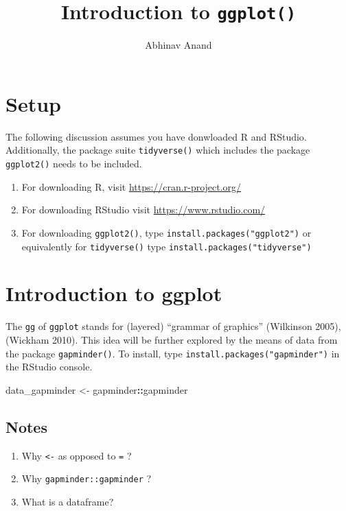 \documentclass[]{article}
\title{Introduction to \texttt{ggplot()}}
\author{Abhinav Anand}
\date{}
\newenvironment{Shaded}{\begin{snugshade}}{\end{snugshade}}
\newcommand{\StringTok}[1]{\textcolor[rgb]{0.31,0.60,0.02}{#1}}
\newcommand{\OperatorTok}[1]{\textcolor[rgb]{0.81,0.36,0.00}{\textbf{#1}}}
\newcommand{\NormalTok}[1]{#1}
\providecommand{\tightlist}{%
  \setlength{\itemsep}{0pt}\setlength{\parskip}{0pt}}
\begin{document}
\maketitle

\section{Setup}\label{setup}

The following discussion assumes you have donwloaded R and RStudio.
Additionally, the package suite \texttt{tidyverse()} which includes the
package \texttt{ggplot2()} needs to be included.

\begin{enumerate}
\def\labelenumi{\arabic{enumi}.}
\tightlist
\item
  For downloading R, visit \url{https://cran.r-project.org/}
\item
  For downloading RStudio visit \url{https://www.rstudio.com/}
\item
  For downloading \texttt{ggplot2()}, type
  \texttt{install.packages("ggplot2")} or equivalently for
  \texttt{tidyverse()} type \texttt{install.packages("tidyverse")}
\end{enumerate}

\section{Introduction to ggplot}\label{introduction-to-ggplot}

The \texttt{gg} of \texttt{ggplot} stands for (layered) ``grammar of
graphics'' (Wilkinson 2005), (Wickham 2010). This idea will be further
explored by the means of data from the package \texttt{gapminder()}. To
install, type \texttt{install.packages("gapminder")} in the RStudio
console.

\begin{Shaded}
\begin{Highlighting}[]
\NormalTok{data_gapminder <-}\StringTok{ }\NormalTok{gapminder}\OperatorTok{::}\NormalTok{gapminder }
\end{Highlighting}
\end{Shaded}

\subsection{Notes}\label{notes}

\begin{enumerate}
\def\labelenumi{\arabic{enumi}.}
\item
  Why \texttt{\textless{}-} as opposed to \texttt{=} ?
\item
  Why \texttt{gapminder::gapminder} ?
\item
  What is a dataframe?
\end{enumerate}
\end{document}
